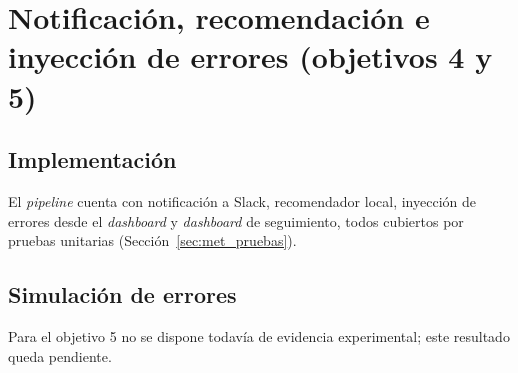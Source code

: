 \section{Notificación, recomendación e inyección de errores (objetivos 4 y 5)}\label{sec:res_reaccion}

\subsection{Implementación}

El \textit{pipeline} cuenta con notificación a Slack, recomendador local, inyección de errores desde el \textit{dashboard} y \textit{dashboard} de seguimiento, todos cubiertos por pruebas unitarias (Sección~\ref{sec:met_pruebas}). %

\subsection{Simulación de errores}

Para el objetivo 5 no se dispone todavía de evidencia experimental; este resultado queda pendiente.
